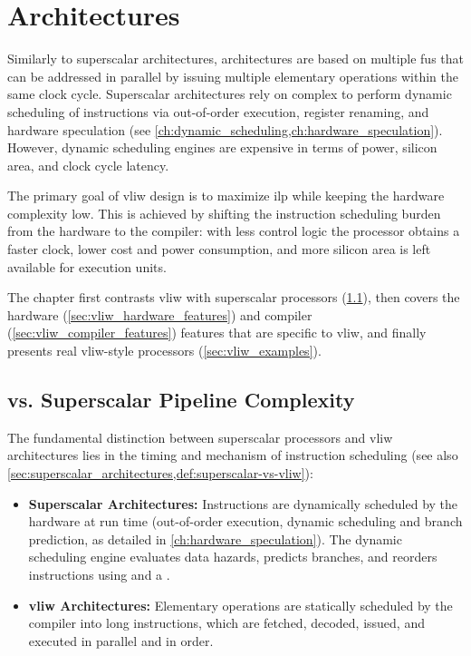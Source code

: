\chapter{ Architectures}
\label{ch:vliw_architectures}

Similarly to superscalar architectures,  architectures are based on multiple \glspl{fu} that can be addressed in parallel by issuing multiple elementary operations within the same clock cycle. Superscalar architectures rely on complex  to perform dynamic scheduling of instructions via out-of-order execution, register renaming, and hardware speculation (see \cref{ch:dynamic_scheduling,ch:hardware_speculation}). However, dynamic scheduling engines are expensive in terms of power, silicon area, and clock cycle latency.

The primary goal of \gls{vliw} design is to maximize \gls{ilp} while keeping the hardware complexity low. This is achieved by shifting the instruction scheduling burden from the hardware to the compiler: with less control logic the processor obtains a faster clock, lower cost and power consumption, and more silicon area is left available for execution units.

The chapter first contrasts \gls{vliw} with superscalar processors (\cref{sec:vliw_vs_superscalar_complexity}), then covers the hardware (\cref{sec:vliw_hardware_features}) and compiler (\cref{sec:vliw_compiler_features}) features that are specific to \gls{vliw}, and finally presents real \gls{vliw}-style processors (\cref{sec:vliw_examples}).

\section{ vs. Superscalar Pipeline Complexity}
\label{sec:vliw_vs_superscalar_complexity}

The fundamental distinction between superscalar processors and \gls{vliw} architectures lies in the timing and mechanism of instruction scheduling (see also \cref{sec:superscalar_architectures,def:superscalar-vs-vliw}):
\begin{itemize}
    \item \textbf{Superscalar Architectures:} Instructions are dynamically scheduled by the hardware at run time (out-of-order execution, dynamic scheduling and branch prediction, as detailed in \cref{ch:hardware_speculation}). The dynamic scheduling engine evaluates data hazards, predicts branches, and reorders instructions using  and a .
    \item \textbf{\gls{vliw} Architectures:} Elementary operations are statically scheduled by the compiler into long instructions, which are fetched, decoded, issued, and executed in parallel and in order.
\end{itemize}

